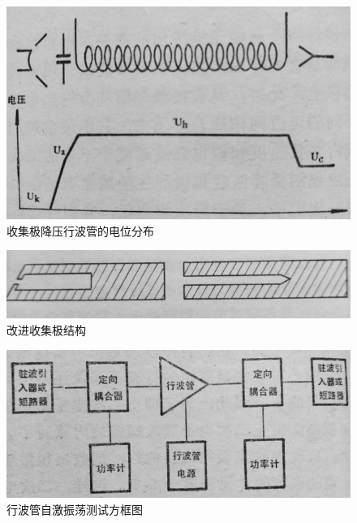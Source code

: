 \begin{figure}[phtb]
	\centering
	\includegraphics[width=0.65\linewidth]{figure/ch5-4}
	\caption{收集极降压行波管的电位分布}
	\label{ch5-4}
\end{figure}

\begin{figure}[phtb]
	\centering
	\includegraphics[width=0.65\linewidth]{figure/ch5-5}
	\caption{改进收集极结构}
	\label{ch5-5}
\end{figure}

\begin{figure}[phtb]
	\centering
	\includegraphics[width=0.65\linewidth]{figure/ch5-6}
	\caption{行波管自激振荡测试方框图}
	\label{ch5-6}
\end{figure}